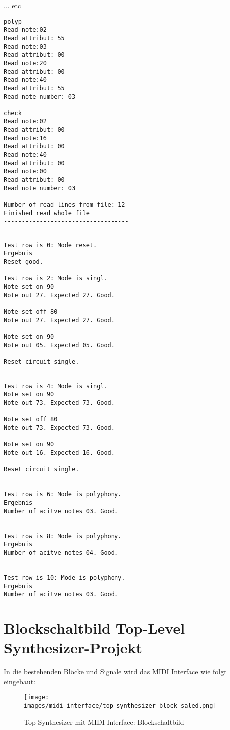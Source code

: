 ... etc \\

\begin{verbatim}
polyp
Read note:02
Read attribut: 55
Read note:03
Read attribut: 00
Read note:20
Read attribut: 00
Read note:40
Read attribut: 55
Read note number: 03

check
Read note:02
Read attribut: 00
Read note:16
Read attribut: 00
Read note:40
Read attribut: 00
Read note:00
Read attribut: 00
Read note number: 03

Number of read lines from file: 12
Finished read whole file
-----------------------------------
-----------------------------------
\end{verbatim}

\begin{verbatim}
Test row is 0: Mode reset.
Ergebnis
Reset good.

Test row is 2: Mode is singl.
Note set on 90
Note out 27. Expected 27. Good.

Note set off 80
Note out 27. Expected 27. Good.

Note set on 90
Note out 05. Expected 05. Good.

Reset circuit single.


Test row is 4: Mode is singl.
Note set on 90
Note out 73. Expected 73. Good.

Note set off 80
Note out 73. Expected 73. Good.

Note set on 90
Note out 16. Expected 16. Good.

Reset circuit single.

 
Test row is 6: Mode is polyphony.
Ergebnis
Number of acitve notes 03. Good. 

 
Test row is 8: Mode is polyphony.
Ergebnis
Number of acitve notes 04. Good. 

 
Test row is 10: Mode is polyphony.
Ergebnis
Number of acitve notes 03. Good. 
\end{verbatim}

\chapter{Blockschaltbild Top-Level Synthesizer-Projekt}\label{chap.anhang_top_synthesizer}

In die bestehenden Blöcke und Signale wird das MIDI Interface wie folgt eingebaut:

\begin{figure}[H]
	\texttt{[image: images/midi\_interface/top\_synthesizer\_block\_saled.png]}
	\caption{Top Synthesizer mit MIDI Interface: Blockschaltbild}
	\label{fig.top_synthesizer_block}
\end{figure}

